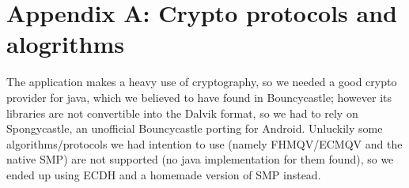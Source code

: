 \chapter{Appendix A: Crypto protocols and alogrithms}
\small{The application makes a heavy use of cryptography, so we needed a good crypto provider for java, which we believed to have found in Bouncycastle; however its libraries are not convertible into the Dalvik format, so we had to rely on Spongycastle, an unofficial Bouncycastle porting for Android. Unluckily some algorithms/protocols we had intention to use (namely FHMQV/ECMQV and the native SMP) are not supported (no java implementation for them found), so we ended up using ECDH and a homemade version of SMP instead.}